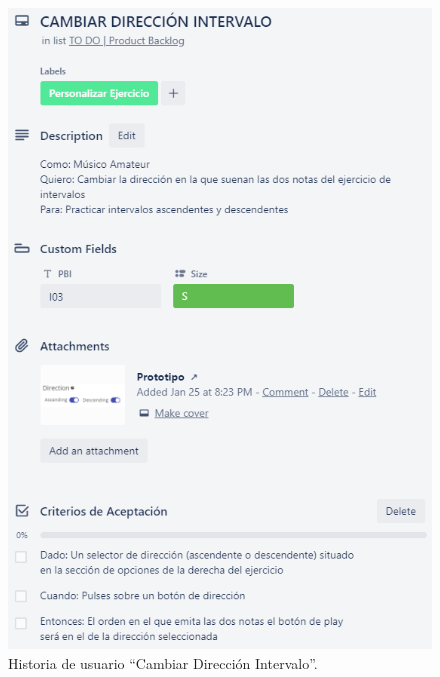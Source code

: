 \documentclass[12pt,twoside,titlepage]{report}
\begin{document}
\begin{figure}[H]
    \centering
    \includegraphics[scale=1.3]{Scrum/User Stories/IntervalosDireccion}
    \caption{Historia de usuario ``Cambiar Dirección Intervalo''.}
    \label{fig:IntervalosDireccion}
\end{figure}
\end{document}
